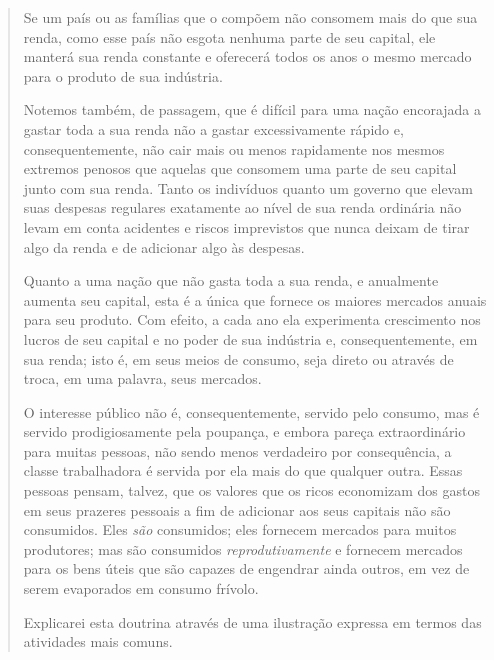 \documentclass[12pt]{article}
\begin{document}
\begin{quote}
Se um país ou as famílias que o compõem não consomem mais do que sua renda, como esse país não esgota nenhuma parte de seu capital, ele manterá sua renda constante e oferecerá todos os anos o mesmo mercado para o produto de sua indústria.

Notemos também, de passagem, que é difícil para uma nação encorajada a gastar toda a sua renda não a gastar excessivamente rápido e, consequentemente, não cair mais ou menos rapidamente nos mesmos extremos penosos que aquelas que consomem uma parte de seu capital junto com sua renda. Tanto os indivíduos quanto um governo que elevam suas despesas regulares exatamente ao nível de sua renda ordinária não levam em conta acidentes e riscos imprevistos que nunca deixam de tirar algo da renda e de adicionar algo às despesas.

Quanto a uma nação que não gasta toda a sua renda, e anualmente aumenta seu capital, esta é a única que fornece os maiores mercados anuais para seu produto. Com efeito, a cada ano ela experimenta crescimento nos lucros de seu capital e no poder de sua indústria e, consequentemente, em sua renda; isto é, em seus meios de consumo, seja direto ou através de troca, em uma palavra, seus mercados.

O interesse público não é, consequentemente, servido pelo consumo, mas é servido prodigiosamente pela poupança, e embora pareça extraordinário para muitas pessoas, não sendo menos verdadeiro por consequência, a classe trabalhadora é servida por ela mais do que qualquer outra. Essas pessoas pensam, talvez, que os valores que os ricos economizam dos gastos em seus prazeres pessoais a fim de adicionar aos seus capitais não são consumidos. Eles \textit{são} consumidos; eles fornecem mercados para muitos produtores; mas são consumidos \textit{reprodutivamente} e fornecem mercados para os bens úteis que são capazes de engendrar ainda outros, em vez de serem evaporados em consumo frívolo.

Explicarei esta doutrina através de uma ilustração expressa em termos das atividades mais comuns.


\end{quote}
\end{document}
